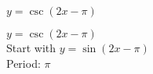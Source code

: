 {$y = \csc (2x - \pi)$}
{$y = \csc (2x - \pi)$\\
Start with $y = \sin(2x - \pi)$\\
Period: $\pi$

\begin{center}
\end{center}
}
